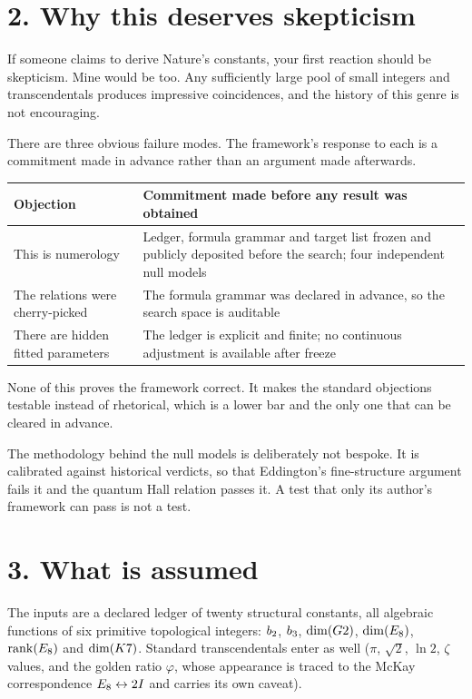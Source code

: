 \documentclass[11pt,a4paper]{article}
\begin{document}
\section{2. Why this deserves skepticism}

If someone claims to derive Nature's constants, your first reaction should
be skepticism. Mine would be too. Any sufficiently large pool of small
integers and transcendentals produces impressive coincidences, and the
history of this genre is not encouraging.

There are three obvious failure modes. The framework's response to each is
a commitment made in advance rather than an argument made afterwards.

\begin{center}
\begin{tabular}{@{}p{}p{}@{}}
\toprule
\textbf{Objection} & \textbf{Commitment made before any result was obtained} \\
\midrule
This is numerology & Ledger, formula grammar and target list frozen and publicly deposited before the search; four independent null models \\
The relations were cherry-picked & The formula grammar was declared in advance, so the search space is auditable \\
There are hidden fitted parameters & The ledger is explicit and finite; no continuous adjustment is available after freeze \\
\bottomrule
\end{tabular}
\end{center}

None of this proves the framework correct. It makes the standard
objections testable instead of rhetorical, which is a lower bar and the
only one that can be cleared in advance.

The methodology behind the null models is deliberately not bespoke. It is
calibrated against historical verdicts, so that Eddington's fine-structure
argument fails it and the quantum Hall relation passes it. A test that only
its author's framework can pass is not a test.

\section{3. What is assumed}

The inputs are a declared ledger of twenty structural constants, all
algebraic functions of six primitive topological integers: $b_2$,
$b_3$, $\dim(G2)$, $\dim(E_8)$, $\mathrm{rank}(E_8)$ and
$\dim(K7)$. Standard transcendentals enter as well ($\pi$, $\sqrt{2}$,
$\ln 2$, $\zeta$ values, and the golden ratio $\varphi$, whose appearance
is traced to the McKay correspondence $E_8 \leftrightarrow 2I$ and carries
its own caveat).
\end{document}
